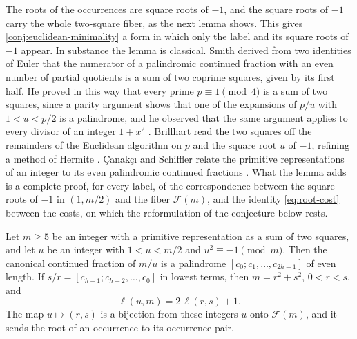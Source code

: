 The roots of the occurrences are square roots of $-1$, and the square roots
of $-1$ carry the whole two-square fiber, as the next lemma shows. This gives
\cref{conj:euclidean-minimality} a form in which only the label and its square
roots of $-1$ appear. In substance the lemma is classical. Smith derived from
two identities of Euler that the numerator of a palindromic continued fraction
with an even number of partial quotients is a sum of two coprime squares, given
by its first half. He proved in this way that every prime $p\equiv1\pmod4$ is a
sum of two squares, since a parity argument shows that one of the expansions of
$p/u$ with $1<u<p/2$ is a palindrome, and he observed that the same argument
applies to every divisor of an integer $1+x^2$ \cite{Smith1855}. Brillhart read
the two squares off the remainders of the Euclidean algorithm on $p$ and the
square root $u$ of $-1$, refining a method of Hermite \cite{Brillhart1972}.
\c{C}anak\c{c}{\i} and Schiffler relate the primitive representations of an
integer to its even palindromic continued fractions \cite[Theorem~3.10 and
Corollary~3.14]{CanakciSchiffler2020}. What the lemma adds is a complete proof,
for every label, of the correspondence between the square roots of $-1$ in
$(1,m/2)$ and the fiber $\mathcal F(m)$, and the identity \eqref{eq:root-cost}
between the costs, on which the reformulation of the conjecture below rests.

\begin{lemma}\label{lem:square-roots}
Let $m\geqslant5$ be an integer with a primitive representation as a sum of two
squares, and let $u$ be an integer with $1<u<m/2$ and $u^2\equiv-1\pmod m$.
Then the canonical continued fraction of $m/u$ is a palindrome
$[c_0;c_1,\ldots,c_{2h-1}]$ of even length. If $s/r=[c_{h-1};c_{h-2},\ldots,c_0]$
in lowest terms, then $m=r^2+s^2$, $0<r<s$, and
\begin{equation}\label{eq:root-cost}
 \ell(u,m)=2\,\ell(r,s)+1 .
\end{equation}
The map $u\mapsto(r,s)$ is a bijection from these integers $u$ onto
$\mathcal F(m)$, and it sends the root of an occurrence to its occurrence pair.
\end{lemma}


